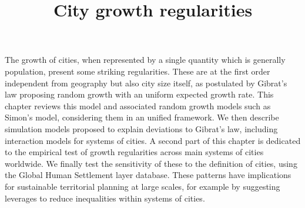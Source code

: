 \documentclass[11pt]{article}
\begin{document}
	
	
\title{City growth regularities}
	
	
The growth of cities, when represented by a single quantity which is generally population, present some striking regularities. These are at the first order independent from geography but also city size itself, as postulated by Gibrat's law proposing random growth with an uniform expected growth rate. This chapter reviews this model and associated random growth models such as Simon's model, considering them in an unified framework. We then describe simulation models proposed to explain deviations to Gibrat's law, including interaction models for systems of cities. A second part of this chapter is dedicated to the empirical test of growth regularities across main systems of cities worldwide. We finally test the sensitivity of these to the definition of cities, using the Global Human Settlement layer database. These patterns have implications for sustainable territorial planning at large scales, for example by suggesting leverages to reduce inequalities within systems of cities.



\cite{gabaix2004evolution}
\cite{batty2008size}
\cite{mitzenmacher2004brief}
\cite{gabaix1999zipf}



	
	



	
\end{document}
